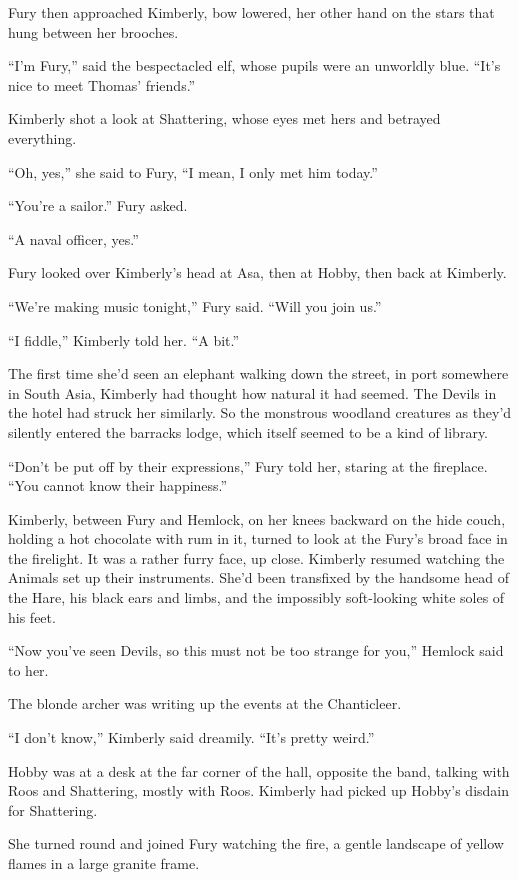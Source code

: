 \documentclass[11pt,a5paper]{article}
\begin{document}
Fury then approached Kimberly, bow lowered, her other hand on the stars that hung between her brooches.

``I'm Fury,'' said the bespectacled elf, whose pupils were an unworldly blue. ``It's nice to meet Thomas' friends.''

Kimberly shot a look at Shattering, whose eyes met hers and betrayed everything.

``Oh, yes,'' she said to Fury, ``I mean, I only met him today.''

``You're a sailor.'' Fury asked.

``A naval officer, yes.''

Fury looked over Kimberly's head at Asa, then at Hobby, then back at Kimberly.

``We're making music tonight,'' Fury said. ``Will you join us.''

``I fiddle,'' Kimberly told her. ``A bit.''



The first time she'd seen an elephant walking down the street, in port somewhere in South Asia, Kimberly had thought how natural it had seemed. The Devils in the hotel had struck her similarly. So the monstrous woodland creatures as they'd silently entered the barracks lodge, which itself seemed to be a kind of library.

``Don't be put off by their expressions,'' Fury told her, staring at the fireplace. ``You cannot know their happiness.''

Kimberly, between Fury and Hemlock, on her knees backward on the hide couch, holding a hot chocolate with rum in it, turned to look at the Fury's broad face in the firelight. It was a rather furry face, up close. Kimberly resumed watching the Animals set up their instruments. She'd been transfixed by the handsome head of the Hare, his black ears and limbs, and the impossibly soft-looking white soles of his feet.

``Now you've seen Devils, so this must not be too strange for you,'' Hemlock said to her.

The blonde archer was writing up the events at the Chanticleer.

``I don't know,'' Kimberly said dreamily. ``It's pretty weird.''

Hobby was at a desk at the far corner of the hall, opposite the band, talking with Roos and Shattering, mostly with Roos. Kimberly had picked up Hobby's disdain for Shattering.

She turned round and joined Fury watching the fire, a gentle landscape of yellow flames in a large granite frame.
\end{document}
